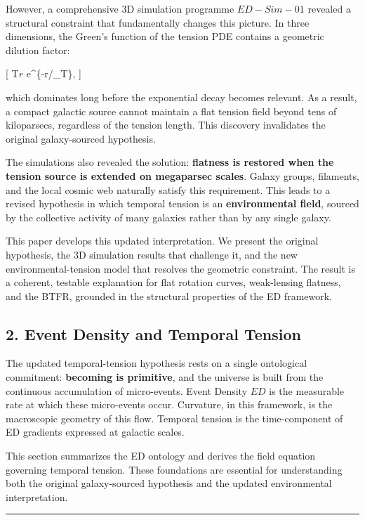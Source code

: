 However, a comprehensive 3D simulation programme \(ED-Sim-01\) revealed
a structural constraint that fundamentally changes this picture. In
three dimensions, the Green's function of the tension PDE contains a
geometric dilution factor:

{[} T\(r\) \propto {} e\^{}\{-r/\ell\_T\}, {]}

which dominates long before the exponential decay becomes relevant. As a
result, a compact galactic source cannot maintain a flat tension field
beyond tens of kiloparsecs, regardless of the tension length. This
discovery invalidates the original galaxy-sourced hypothesis.

The simulations also revealed the solution: \textbf{flatness is restored
when the tension source is extended on megaparsec scales}. Galaxy
groups, filaments, and the local cosmic web naturally satisfy this
requirement. This leads to a revised hypothesis in which temporal
tension is an \textbf{environmental field}, sourced by the collective
activity of many galaxies rather than by any single galaxy.

This paper develops this updated interpretation. We present the original
hypothesis, the 3D simulation results that challenge it, and the new
environmental-tension model that resolves the geometric constraint. The
result is a coherent, testable explanation for flat rotation curves,
weak-lensing flatness, and the BTFR, grounded in the structural
properties of the ED framework.

\subsection{2. Event Density and Temporal
Tension}\label{event-density-and-temporal-tension}

The updated temporal-tension hypothesis rests on a single ontological
commitment: \textbf{becoming is primitive}, and the universe is built
from the continuous accumulation of micro-events. Event Density \(ED\)
is the measurable rate at which these micro-events occur. Curvature, in
this framework, is the macroscopic geometry of this flow. Temporal
tension is the time-component of ED gradients expressed at galactic
scales.

This section summarizes the ED ontology and derives the field equation
governing temporal tension. These foundations are essential for
understanding both the original galaxy-sourced hypothesis and the
updated environmental interpretation.

\begin{center}\rule{0.5\linewidth}{0.5pt}\end{center}

